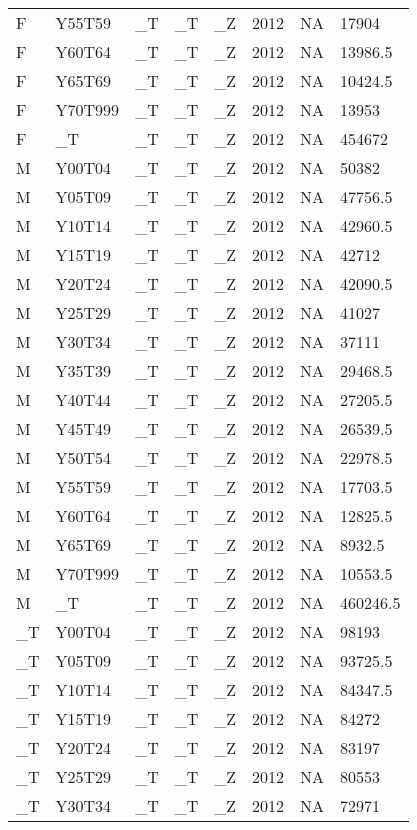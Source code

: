 \begin{longtable}[t]{llllllll}
\addlinespace
F & Y55T59 & \_T & \_T & \_Z & 2012 & NA & 17904\\
F & Y60T64 & \_T & \_T & \_Z & 2012 & NA & 13986.5\\
F & Y65T69 & \_T & \_T & \_Z & 2012 & NA & 10424.5\\
F & Y70T999 & \_T & \_T & \_Z & 2012 & NA & 13953\\
F & \_T & \_T & \_T & \_Z & 2012 & NA & 454672\\
\addlinespace
M & Y00T04 & \_T & \_T & \_Z & 2012 & NA & 50382\\
M & Y05T09 & \_T & \_T & \_Z & 2012 & NA & 47756.5\\
M & Y10T14 & \_T & \_T & \_Z & 2012 & NA & 42960.5\\
M & Y15T19 & \_T & \_T & \_Z & 2012 & NA & 42712\\
M & Y20T24 & \_T & \_T & \_Z & 2012 & NA & 42090.5\\
\addlinespace
M & Y25T29 & \_T & \_T & \_Z & 2012 & NA & 41027\\
M & Y30T34 & \_T & \_T & \_Z & 2012 & NA & 37111\\
M & Y35T39 & \_T & \_T & \_Z & 2012 & NA & 29468.5\\
M & Y40T44 & \_T & \_T & \_Z & 2012 & NA & 27205.5\\
M & Y45T49 & \_T & \_T & \_Z & 2012 & NA & 26539.5\\
\addlinespace
M & Y50T54 & \_T & \_T & \_Z & 2012 & NA & 22978.5\\
M & Y55T59 & \_T & \_T & \_Z & 2012 & NA & 17703.5\\
M & Y60T64 & \_T & \_T & \_Z & 2012 & NA & 12825.5\\
M & Y65T69 & \_T & \_T & \_Z & 2012 & NA & 8932.5\\
M & Y70T999 & \_T & \_T & \_Z & 2012 & NA & 10553.5\\
\addlinespace
M & \_T & \_T & \_T & \_Z & 2012 & NA & 460246.5\\
\_T & Y00T04 & \_T & \_T & \_Z & 2012 & NA & 98193\\
\_T & Y05T09 & \_T & \_T & \_Z & 2012 & NA & 93725.5\\
\_T & Y10T14 & \_T & \_T & \_Z & 2012 & NA & 84347.5\\
\_T & Y15T19 & \_T & \_T & \_Z & 2012 & NA & 84272\\
\addlinespace
\_T & Y20T24 & \_T & \_T & \_Z & 2012 & NA & 83197\\
\_T & Y25T29 & \_T & \_T & \_Z & 2012 & NA & 80553\\
\_T & Y30T34 & \_T & \_T & \_Z & 2012 & NA & 72971\\

\end{longtable}
